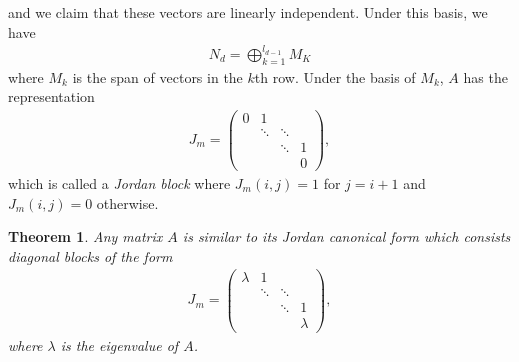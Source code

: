 \documentclass[11pt]{book}
\newtheorem{theorem}{Theorem}[chapter]
\theoremstyle{definition}
\numberwithin{equation}{chapter}
\begin{document}
and we claim that these vectors are linearly independent. Under this basis, we have 
\begin{align*}
    N_d = \bigoplus^{l_{d-1}}_{k=1} M_K
\end{align*}
where $M_k$ is the span of vectors in the $k$th row. Under the basis of $M_k$, $A$ has the representation
\begin{align*}
    J_m = \begin{pmatrix}
    0 & 1 &  &  \\
     &\ddots & \ddots & \\
     &   & \ddots & 1 \\
     &  &  & 0
    \end{pmatrix},
\end{align*}
which is called a \emph{Jordan block} where $J_m(i,j) = 1$ for $j = i+1$ and $J_m(i,j) = 0$ otherwise.

\medskip

\begin{theorem}
Any matrix $A$ is similar to its Jordan canonical form which consists diagonal blocks of the form 
\begin{align*}
    J_m = \begin{pmatrix}
    \lambda & 1 &  &  \\
     &\ddots & \ddots & \\
     &   & \ddots & 1 \\
     &  &  & \lambda
    \end{pmatrix},
\end{align*}
where $\lambda$ is the eigenvalue of $A$.
\end{theorem}

\medskip
\end{document}
